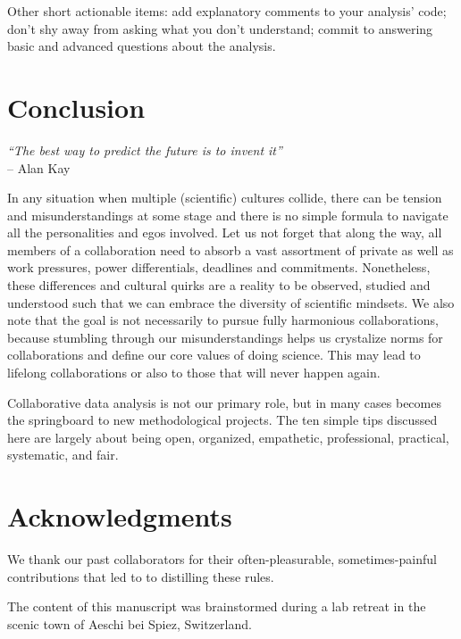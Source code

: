 \documentclass{article}
\begin{document}
Other short actionable items: add explanatory comments to your analysis’ code; don’t shy away from asking what you don’t understand; commit to answering basic and advanced questions about the analysis.

\section*{Conclusion} %

\begin{flushright}
\rightskip=1cm\textit{``The best way to predict the future is to invent it''} \\
\vspace{.2em}
\rightskip=0cm -- Alan Kay
\end{flushright}

In any situation when multiple (scientific) cultures collide, there can be tension and misunderstandings at some stage and there is no simple formula to navigate all the personalities and egos involved. Let us not forget that along the way, all members of a collaboration need to absorb a vast assortment of private as well as work pressures, power differentials, deadlines and commitments. Nonetheless, these differences and cultural quirks are a reality to be observed, studied and understood such that we can embrace the diversity of scientific mindsets. We also note that the goal is not necessarily to pursue fully harmonious collaborations, because stumbling through our misunderstandings helps us crystalize norms for collaborations and define our core values of doing science. This may lead to lifelong collaborations or also to those that will never happen again.

Collaborative data analysis is not our primary role, but in many cases becomes the springboard to new methodological projects. The ten simple tips discussed here are largely about being open, organized, empathetic, professional, practical, systematic, and fair.

\section*{Acknowledgments} %

We thank our past collaborators for their often-pleasurable, sometimes-painful contributions that led to to distilling these rules.

The content of this manuscript was brainstormed during a lab retreat in the scenic town of Aeschi bei Spiez, Switzerland.
\end{document}

